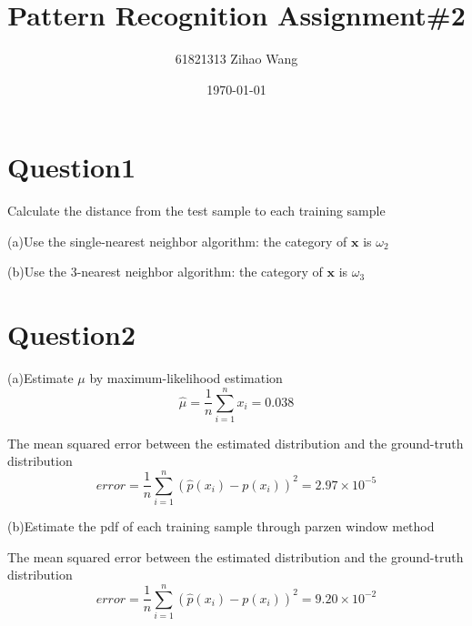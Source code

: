 \documentclass{article}
\title{Pattern Recognition Assignment\#2}
\author{61821313 Zihao Wang}
\date{\today}
\begin{document}
\maketitle

\section*{Question1}

Calculate the distance from the test sample to each training sample

\begin{center}
\end{center}

(a)Use the single-nearest neighbor algorithm: the category of $\mathbf{x}$ is $\omega_{2}$

(b)Use the 3-nearest neighbor algorithm: the category of $\mathbf{x}$ is $\omega_{3}$

\section*{Question2}

(a)Estimate $\mu$ by maximum-likelihood estimation
$$
\hat{\mu} = \frac{1}{n} \sum_{i = 1}^{n} x_{i} = 0.038
$$

The mean squared error between the estimated distribution and the ground-truth distribution
$$
error = \frac{1}{n} \sum_{i = 1}^{n} (\hat{p}(x_{i}) - p(x_{i}))^2 = 2.97 \times 10^{-5}
$$

(b)Estimate the pdf of each training sample through parzen window method

\begin{center}
\end{center}

The mean squared error between the estimated distribution and the ground-truth distribution
$$
error = \frac{1}{n} \sum_{i = 1}^{n} (\hat{p}(x_{i}) - p(x_{i}))^2 = 9.20 \times 10^{-2}
$$
\end{document}
